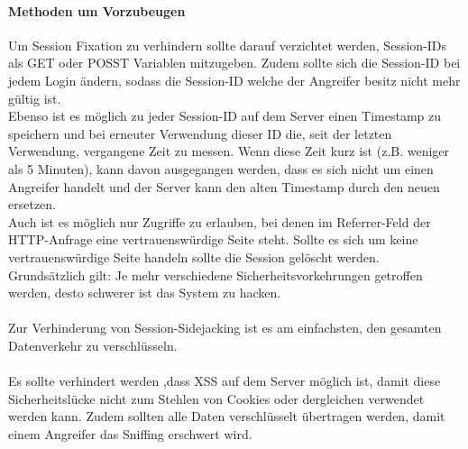 \paragraph{Methoden um Vorzubeugen}
Um Session Fixation zu verhindern sollte darauf verzichtet werden, Session-IDs als GET oder POSST Variablen mitzugeben. Zudem sollte sich die Session-ID bei jedem Login ändern, sodass die Session-ID welche der Angreifer besitz nicht mehr gültig ist.\\ Ebenso ist es möglich zu jeder Session-ID auf dem Server einen Timestamp zu speichern und bei erneuter Verwendung dieser ID die, seit der letzten Verwendung, vergangene Zeit zu messen. Wenn diese Zeit kurz ist (z.B. weniger als 5 Minuten), kann davon ausgegangen werden, dass es sich nicht um einen Angreifer handelt und der Server kann den alten Timestamp durch den neuen ersetzen.\\ Auch ist es möglich nur Zugriffe zu erlauben, bei denen im Referrer-Feld der HTTP-Anfrage eine vertrauenswürdige Seite steht. Sollte es sich um keine vertrauenswürdige Seite handeln sollte die Session gelöscht werden.\\
Grundsätzlich gilt: Je mehr verschiedene Sicherheitsvorkehrungen getroffen werden, desto schwerer ist das System zu hacken.\\\\
Zur Verhinderung von Session-Sidejacking ist es am einfachsten, den gesamten Datenverkehr zu verschlüsseln. 
\\\\Es sollte verhindert werden ,dass XSS auf dem Server möglich ist, damit diese Sicherheitslücke nicht zum Stehlen von Cookies oder dergleichen verwendet werden kann. Zudem sollten alle Daten verschlüsselt übertragen werden, damit einem Angreifer das Sniffing erschwert wird.